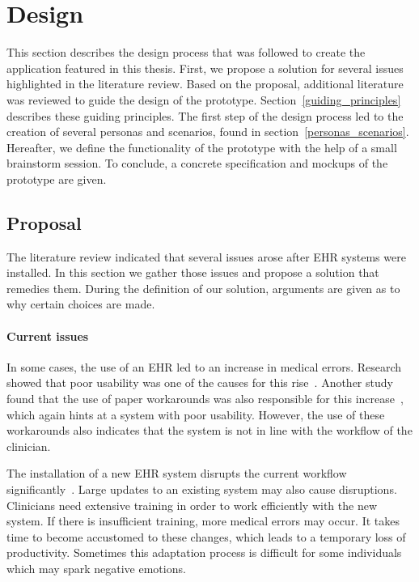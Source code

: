 \section{Design}\label{design}

This section describes the design process that was followed to create the application featured in this thesis. First, we propose a solution for several issues highlighted in the literature review. Based on the proposal, additional literature was reviewed to guide the design of the prototype. Section~\ref{guiding_principles} describes these guiding principles. The first step of the design process led to the creation of several personas and scenarios, found in section~\ref{personas_scenarios}. Hereafter, we define the functionality of the prototype with the help of a small brainstorm session. To conclude, a concrete specification and mockups of the prototype are given.

    \subsection{Proposal}
    
    The literature review indicated that several issues arose after EHR systems were installed. In this section we gather those issues and propose a solution that remedies them. During the definition of our solution, arguments are given as to why certain choices are made.

    \paragraph{Current issues} In some cases, the use of an EHR led to an increase in medical errors. Research showed that poor usability was one of the causes for this rise~\cite{Koppel2005}. Another study found that the use of paper workarounds was also responsible for this increase~\cite{Saleem2009}, which again hints at a system with poor usability. However, the use of these workarounds also indicates that the system is not in line with the workflow of the clinician.

    The installation of a new EHR system disrupts the current workflow significantly~\cite{Menachemi2011}. Large updates to an existing system may also cause disruptions. Clinicians need extensive training in order to work efficiently with the new system. If there is insufficient training, more medical errors may occur. It takes time to become accustomed to these changes, which leads to a temporary loss of productivity. Sometimes this adaptation process is difficult for some individuals which may spark negative emotions.

